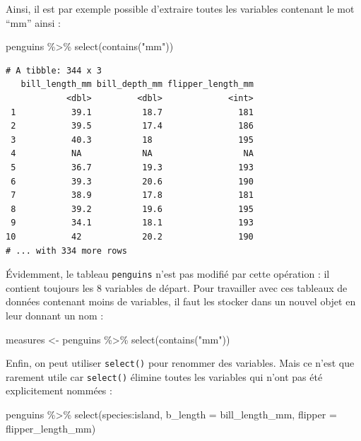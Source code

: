 \documentclass[
  letterpaper,
  DIV=11,
  numbers=noendperiod]{scrreprt}
\newenvironment{Shaded}{\begin{snugshade}}{\end{snugshade}}
\newcommand{\AttributeTok}[1]{\textcolor[rgb]{0.40,0.45,0.13}{#1}}
\newcommand{\FunctionTok}[1]{\textcolor[rgb]{0.28,0.35,0.67}{#1}}
\newcommand{\NormalTok}[1]{\textcolor[rgb]{0.00,0.23,0.31}{#1}}
\newcommand{\OtherTok}[1]{\textcolor[rgb]{0.00,0.23,0.31}{#1}}
\newcommand{\SpecialCharTok}[1]{\textcolor[rgb]{0.37,0.37,0.37}{#1}}
\newcommand{\StringTok}[1]{\textcolor[rgb]{0.13,0.47,0.30}{#1}}
\begin{document}
Ainsi, il est par exemple possible d'extraire toutes les variables
contenant le mot ``mm'' ainsi :

\begin{Shaded}
\begin{Highlighting}[]
\NormalTok{penguins }\SpecialCharTok{\%\textgreater{}\%}
  \FunctionTok{select}\NormalTok{(}\FunctionTok{contains}\NormalTok{(}\StringTok{"mm"}\NormalTok{))}
\end{Highlighting}
\end{Shaded}

\begin{verbatim}
# A tibble: 344 x 3
   bill_length_mm bill_depth_mm flipper_length_mm
            <dbl>         <dbl>             <int>
 1           39.1          18.7               181
 2           39.5          17.4               186
 3           40.3          18                 195
 4           NA            NA                  NA
 5           36.7          19.3               193
 6           39.3          20.6               190
 7           38.9          17.8               181
 8           39.2          19.6               195
 9           34.1          18.1               193
10           42            20.2               190
# ... with 334 more rows
\end{verbatim}

Évidemment, le tableau \texttt{penguins} n'est pas modifié par cette
opération : il contient toujours les 8 variables de départ. Pour
travailler avec ces tableaux de données contenant moins de variables, il
faut les stocker dans un nouvel objet en leur donnant un nom :

\begin{Shaded}
\begin{Highlighting}[]
\NormalTok{measures }\OtherTok{\textless{}{-}}\NormalTok{ penguins }\SpecialCharTok{\%\textgreater{}\%}
  \FunctionTok{select}\NormalTok{(}\FunctionTok{contains}\NormalTok{(}\StringTok{"mm"}\NormalTok{))}
\end{Highlighting}
\end{Shaded}

Enfin, on peut utiliser \texttt{select()} pour renommer des variables.
Mais ce n'est que rarement utile car \texttt{select()} élimine toutes
les variables qui n'ont pas été explicitement nommées :

\begin{Shaded}
\begin{Highlighting}[]
\NormalTok{penguins }\SpecialCharTok{\%\textgreater{}\%}
  \FunctionTok{select}\NormalTok{(species}\SpecialCharTok{:}\NormalTok{island,}
         \AttributeTok{b\_length =}\NormalTok{ bill\_length\_mm,}
         \AttributeTok{flipper =}\NormalTok{ flipper\_length\_mm)}
\end{Highlighting}
\end{Shaded}
\end{document}
